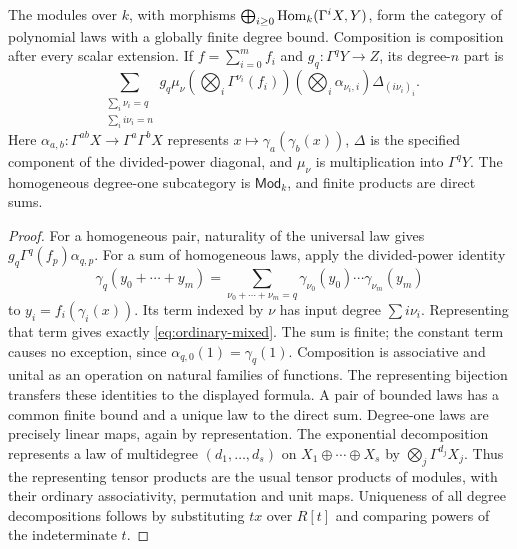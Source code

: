 \begin{proposition}\label{prop:ordinary-polynomial-category}
The modules over $k$, with morphisms
$\bigoplus_{i\ge0}\operatorname{Hom}_k(\Gamma^iX,Y)$, form the category of
polynomial laws with a globally finite degree bound. Composition is
composition after every scalar extension. If
$f=\sum_{i=0}^m f_i$ and $g_q:\Gamma^qY\to Z$, its degree-$n$ part is
\begin{equation}\label{eq:ordinary-mixed}
 \sum_{\substack{\sum_i\nu_i=q\\\sum_i i\nu_i=n}}
 g_q\mu_\nu
 \left(\bigotimes_i\Gamma^{\nu_i}(f_i)\right)
 \left(\bigotimes_i\alpha_{\nu_i,i}\right)
 \Delta_{(i\nu_i)_i}.
\end{equation}
Here $\alpha_{a,b}:\Gamma^{ab}X\to\Gamma^a\Gamma^bX$
represents $x\mapsto\gamma_a(\gamma_b(x))$, $\Delta$ is the
specified component of the divided-power diagonal, and $\mu_\nu$
is multiplication into $\Gamma^qY$. The homogeneous degree-one subcategory is
$\mathsf{Mod}_k$, and finite products are direct sums.
\end{proposition}
\begin{proof}
For a homogeneous pair, naturality of the universal law gives
$g_q\Gamma^q(f_p)\alpha_{q,p}$. For a sum of homogeneous laws,
apply the divided-power identity
\[
 \gamma_q(y_0+\cdots+y_m)=
 \sum_{\nu_0+\cdots+\nu_m=q}
 \gamma_{\nu_0}(y_0)\cdots\gamma_{\nu_m}(y_m)
\]
to $y_i=f_i(\gamma_i(x))$. Its term indexed by $\nu$ has input
degree $\sum i\nu_i$. Representing that term gives exactly
\eqref{eq:ordinary-mixed}. The sum is finite; the constant term
causes no exception, since $\alpha_{q,0}(1)=\gamma_q(1)$.
Composition is associative and unital as an operation on natural
families of functions. The representing bijection transfers these
identities to the displayed formula. A pair of bounded laws has a
common finite bound and a unique law to the direct sum. Degree-one
laws are precisely linear maps, again by representation. The
exponential decomposition represents a law of multidegree
$(d_1,\ldots,d_s)$ on $X_1\oplus\cdots\oplus X_s$ by
$\bigotimes_j\Gamma^{d_j}X_j$. Thus the representing tensor
products are the usual tensor products of modules, with their
ordinary associativity, permutation and unit maps. Uniqueness of
all degree decompositions follows by substituting $tx$ over $R[t]$
and comparing powers of the indeterminate $t$.
\end{proof}

